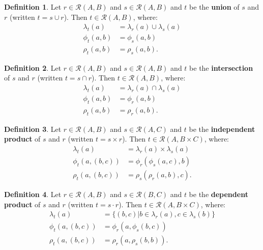 \documentclass{article}
\theoremstyle{definition}
\newtheorem{definition}{Definition}[subsection]
\theoremstyle{plain}
\def\rule{\mathcal{R}}
\begin{document}
\begin{definition}
  Let $ r \in \rule (A, B) $
  and $ s \in \rule (A, B) $
  and $ t $ be the \textbf{union} of $ s $ and $ r $ (written $ t = s \cup r $).
  Then $ t \in \rule (A, B) $, where:
  \begin{align}
    \lambda_t (a)    & = \lambda_r (a) \cup \lambda_s (a) \\
       \phi_t (a, b) & =    \phi_s (a, b) \\
       \rho_t (a, b) & =    \rho_s (a, b).
  \end{align}
\end{definition}

\begin{definition}
  Let $ r \in \rule (A, B) $
  and $ s \in \rule (A, B) $
  and $ t $ be the \textbf{intersection} of $ s $ and $ r $ (written $ t = s \cap r $).
  Then $ t \in \rule (A, B) $, where:
  \begin{align}
    \lambda_t (a)    & = \lambda_r (a) \cap \lambda_s (a) \\
       \phi_t (a, b) & = \phi_r (a, b) \\
       \rho_t (a, b) & = \rho_r (a, b).
  \end{align}
\end{definition}

\begin{definition}
  Let $ r \in \rule (A, B) $
  and $ s \in \rule (A, C) $
  and $ t $ be the \textbf{independent product} of $ s $ and $ r $ (written $ t = s \times r $).
  Then $ t \in \rule (A, B \times C) $, where:
  \begin{align}
    \lambda_t (a)         & = \lambda_r (a) \times \lambda_s (a) \\
       \phi_t (a, (b, c)) & =    \phi_r (\phi_s (a, c), b) \\
       \rho_t (a, (b, c)) & =    \rho_s (\rho_r (a, b), c).
  \end{align}
\end{definition}

\begin{definition}
  Let $ r \in \rule (A, B) $
  and $ s \in \rule (B, C) $
  and $ t $ be the \textbf{dependent product} of $ s $ and $ r $ (written $ t = s \cdot r $).
  Then $ t \in \rule (A, B \times C) $, where:
  \begin{align}
    \lambda_t (a)         & = \{ (b, c) | b \in \lambda_r (a), c \in \lambda_s (b) \} \\
       \phi_t (a, (b, c)) & =    \phi_r (a, \phi_s (b, c)) \\
       \rho_t (a, (b, c)) & =    \rho_r (a, \rho_s (b, b)).
  \end{align}
\end{definition}
\end{document}
